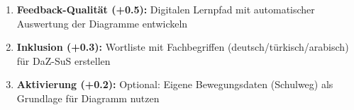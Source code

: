 \documentclass[11pt,a4paper]{article}
\begin{document}
\begin{enumerate}
    \item \textbf{Feedback-Qualität (+0.5):} Digitalen Lernpfad mit automatischer Auswertung der Diagramme entwickeln
    \item \textbf{Inklusion (+0.3):} Wortliste mit Fachbegriffen (deutsch/türkisch/arabisch) für DaZ-SuS erstellen
    \item \textbf{Aktivierung (+0.2):} Optional: Eigene Bewegungsdaten (Schulweg) als Grundlage für Diagramm nutzen
\end{enumerate}

\end{document}
